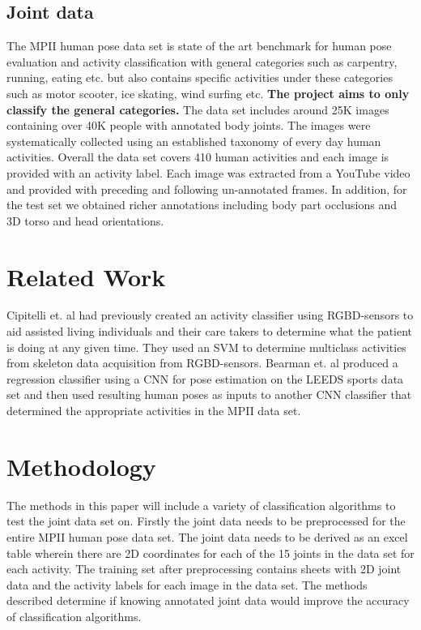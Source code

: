 \documentclass[conference]{IEEEtran}
\begin{document}
\subsection{Joint data}

The MPII human pose data set\cite{b2} is state of the art benchmark for human pose evaluation and activity classification with general categories such as carpentry, running, eating etc. but also contains specific activities under these categories such as motor scooter, ice skating, wind surfing etc. \textbf{The project aims to only classify the general categories.} The data set includes around 25K images containing over 40K people with annotated body joints. The images were systematically collected using an established taxonomy of every day human activities. Overall the data set covers 410 human activities and each image is provided with an activity label. Each image was extracted from a YouTube video and provided with preceding and following un-annotated frames. In addition, for the test set we obtained richer annotations including body part occlusions and 3D torso and head orientations.

\section{Related Work}

Cipitelli et. al \cite{b3} had previously created an activity classifier using RGBD-sensors to aid assisted living individuals and their care takers to determine what the patient is doing at any given time. They used an SVM to determine multiclass activities from skeleton data acquisition from RGBD-sensors. Bearman et. al \cite{b1} produced a regression classifier using a CNN for pose estimation on the LEEDS sports data set and then used resulting human poses as inputs to another CNN classifier that determined the appropriate activities in the MPII data set.

\section{Methodology}

The methods in this paper will include a variety of classification algorithms to test the joint data set on. Firstly the joint data needs to be preprocessed for the entire MPII human pose data set. The joint data needs to be derived as an excel table wherein there are 2D coordinates for each of the 15 joints in the data set for each activity. The training set after preprocessing contains sheets with 2D joint data and the activity labels for each image in the data set. The methods described determine if knowing annotated joint data would improve the accuracy of classification algorithms. 
\end{document}
